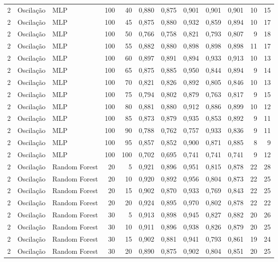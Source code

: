 \begin{longtable}{@{}rllrrrrrrrrr@{}}
2 & Oscilação & MLP & 100 & 40 & 0,880 & 0,875 & 0,901 & 0,901 & 0,901 & 10 & 15 \\
2 & Oscilação & MLP & 100 & 45 & 0,875 & 0,880 & 0,932 & 0,859 & 0,894 & 10 & 17 \\
2 & Oscilação & MLP & 100 & 50 & 0,766 & 0,758 & 0,821 & 0,793 & 0,807 & 9 & 18 \\
2 & Oscilação & MLP & 100 & 55 & 0,882 & 0,880 & 0,898 & 0,898 & 0,898 & 11 & 17 \\
2 & Oscilação & MLP & 100 & 60 & 0,897 & 0,891 & 0,894 & 0,933 & 0,913 & 10 & 13 \\
2 & Oscilação & MLP & 100 & 65 & 0,875 & 0,885 & 0,950 & 0,844 & 0,894 & 9 & 14 \\
2 & Oscilação & MLP & 100 & 70 & 0,821 & 0,826 & 0,892 & 0,805 & 0,846 & 10 & 13 \\
2 & Oscilação & MLP & 100 & 75 & 0,794 & 0,802 & 0,879 & 0,763 & 0,817 & 9 & 15 \\
2 & Oscilação & MLP & 100 & 80 & 0,881 & 0,880 & 0,912 & 0,886 & 0,899 & 10 & 12 \\
2 & Oscilação & MLP & 100 & 85 & 0,873 & 0,879 & 0,935 & 0,853 & 0,892 & 9 & 11 \\
2 & Oscilação & MLP & 100 & 90 & 0,788 & 0,762 & 0,757 & 0,933 & 0,836 & 9 & 11 \\
2 & Oscilação & MLP & 100 & 95 & 0,857 & 0,852 & 0,900 & 0,871 & 0,885 & 8 & 9 \\
2 & Oscilação & MLP & 100 & 100 & 0,702 & 0,695 & 0,741 & 0,741 & 0,741 & 9 & 12 \\
2 & Oscilação & Random Forest & 20 & 5 & 0,921 & 0,896 & 0,951 & 0,815 & 0,878 & 22 & 28 \\
2 & Oscilação & Random Forest & 20 & 10 & 0,920 & 0,892 & 0,956 & 0,804 & 0,873 & 22 & 25 \\
2 & Oscilação & Random Forest & 20 & 15 & 0,902 & 0,870 & 0,933 & 0,769 & 0,843 & 22 & 25 \\
2 & Oscilação & Random Forest & 20 & 20 & 0,924 & 0,895 & 0,970 & 0,802 & 0,878 & 22 & 22 \\
2 & Oscilação & Random Forest & 30 & 5 & 0,913 & 0,898 & 0,945 & 0,827 & 0,882 & 20 & 26 \\
2 & Oscilação & Random Forest & 30 & 10 & 0,911 & 0,896 & 0,938 & 0,826 & 0,879 & 20 & 25 \\
2 & Oscilação & Random Forest & 30 & 15 & 0,902 & 0,881 & 0,941 & 0,793 & 0,861 & 19 & 24 \\
2 & Oscilação & Random Forest & 30 & 20 & 0,890 & 0,875 & 0,902 & 0,804 & 0,851 & 20 & 25 \\

\end{longtable}
